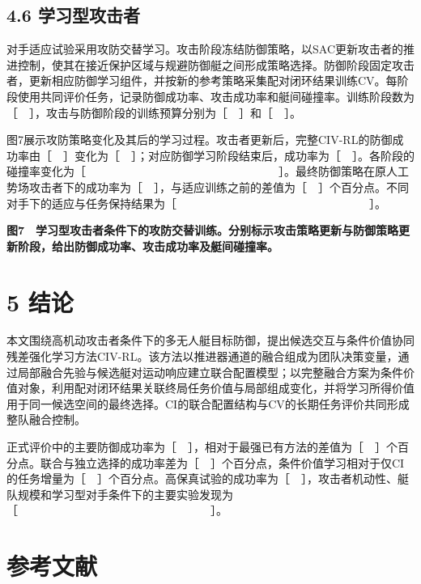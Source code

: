 \documentclass[
  11pt,
  fontset=none]{ctexart}
\newcommand{\blankresultfigure}{\par\Needspace{58mm}\begin{center}\setlength{\fboxsep}{0pt}\fbox{\rule{0pt}{32mm}\rule{.96\linewidth}{0pt}}\end{center}\par\nopagebreak[4]}
\begin{document}
\subsection{4.6
学习型攻击者}\label{ux5b66ux4e60ux578bux653bux51fbux8005}

对手适应试验采用攻防交替学习。攻击阶段冻结防御策略，以SAC更新攻击者的推进控制，使其在接近保护区域与规避防御艇之间形成策略选择。防御阶段固定攻击者，更新相应防御学习组件，并按新的参考策略采集配对闭环结果训练CV。每阶段使用共同评价任务，记录防御成功率、攻击成功率和艇间碰撞率。训练阶段数为［　］，攻击与防御阶段的训练预算分别为［　］和［　］。

图7展示攻防策略变化及其后的学习过程。攻击者更新后，完整CIV-RL的防御成功率由［　］变化为［　］；对应防御学习阶段结束后，成功率为［　］。各阶段的碰撞率变化为［　　　　　　　　　　　　　　　　　］。最终防御策略在原人工势场攻击者下的成功率为［　］，与适应训练之前的差值为［　］个百分点。不同对手下的适应与任务保持结果为［　　　　　　　　　　　　　　　　　］。

\blankresultfigure

\textbf{图7　学习型攻击者条件下的攻防交替训练。分别标示攻击策略更新与防御策略更新阶段，给出防御成功率、攻击成功率及艇间碰撞率。}

\section{5 结论}\label{ux7ed3ux8bba}

本文围绕高机动攻击者条件下的多无人艇目标防御，提出候选交互与条件价值协同残差强化学习方法CIV-RL。该方法以推进器通道的融合组成为团队决策变量，通过局部融合先验与候选艇对运动响应建立联合配置模型；以完整融合方案为条件价值对象，利用配对闭环结果关联终局任务价值与局部组成变化，并将学习所得价值用于同一候选空间的最终选择。CI的联合配置结构与CV的长期任务评价共同形成整队融合控制。

正式评价中的主要防御成功率为［　］，相对于最强已有方法的差值为［　］个百分点。联合与独立选择的成功率差为［　］个百分点，条件价值学习相对于仅CI的任务增量为［　］个百分点。高保真试验的成功率为［　］，攻击者机动性、艇队规模和学习型对手条件下的主要实验发现为［　　　　　　　　　　　　　　　　　］。

\section{参考文献}\label{ux53c2ux8003ux6587ux732e}

\begingroup{}\small
\end{document}
